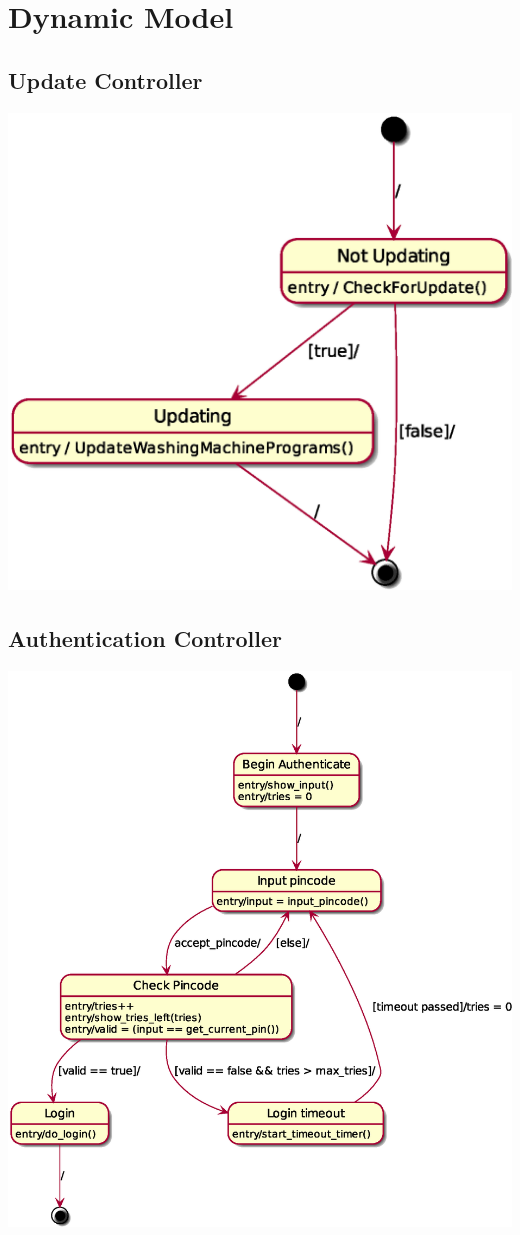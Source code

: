 \chapter{Dynamic Model}

\section{Update Controller}
\includegraphics[scale=0.4]{update_controller.eps}


\section{Authentication Controller}
\includegraphics[scale=0.4]{authentication_controller.eps}


